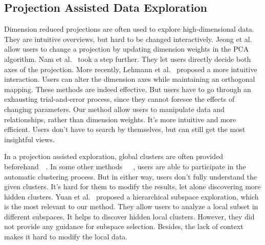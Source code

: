 \subsection{Projection Assisted Data Exploration}
Dimension reduced projections are often used to explore high-dimensional data. They are intuitive overviews, but hard to be changed interactively. Jeong et al.~\cite{DBLP:journals/cgf/JeongZFRC09} allow users to change a projection by updating dimension weights in the PCA algorithm. Nam et al.~\cite{DBLP:journals/tvcg/NamM13} took a step further. They let users directly decide both axes of the projection. More recently, Lehmann et al.~\cite{DBLP:journals/tvcg/LehmannT13} proposed a more intuitive interaction. Users can alter the dimension axes while maintaining an orthogonal mapping. These methods are indeed effective. But users have to go through an exhausting trial-and-error process, since they cannot foresee the effects of changing parameters. Our method allow users to manipulate data and relationships, rather than dimension weights. It's more intuitive and more efficient. Users don't have to search by themselves, but can still get the most insightful views.

In a projection assisted exploration, global clusters are often provided beforehand~\cite{DBLP:journals/tvcg/NamM13}~\cite{DBLP:journals/cgf/LiuWTBP15}. In some other methods~\cite{DBLP:journals/tois/ChenL06}~\cite{DBLP:conf/ieeevast/NamHMZI07}~\cite{DBLP:conf/ieeevast/TatuMFBSSK12}, users are able to participate in the automatic clustering process. But in either way, users don't fully understand the given clusters. It's hard for them to modify the results, let alone discovering more hidden clusters. Yuan et al.~\cite{DBLP:journals/tvcg/YuanRWG13} proposed a hierarchical subspace exploration, which is the most relevant to our method. They allow users to analyze a local subset in different subspaces. It helps to discover hidden local clusters. However, they did not provide any guidance for subspace selection. Besides, the lack of context makes it hard to modify the local data.

